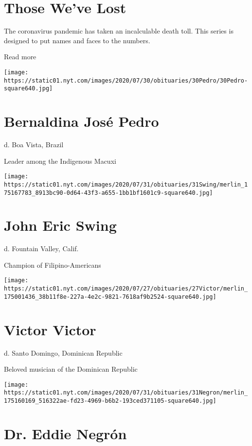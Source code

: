 \hypertarget{those-weve-lost}{%
\section{Those We've Lost}\label{those-weve-lost}}

The coronavirus pandemic has taken an incalculable death toll. This
series is designed to put names and faces to the numbers.

Read more

\texttt{[image: https://static01.nyt.com/images/2020/07/30/obituaries/30Pedro/30Pedro-square640.jpg]}

\hypertarget{bernaldina-josuxe9-pedro}{%
\section{Bernaldina José Pedro}\label{bernaldina-josuxe9-pedro}}

d. Boa Vista, Brazil

Leader among the Indigenous Macuxi

\texttt{[image: https://static01.nyt.com/images/2020/07/31/obituaries/31Swing/merlin\_175167783\_8913bc90-0d64-43f3-a655-1bb1bf1601c9-square640.jpg]}

\hypertarget{john-eric-swing}{%
\section{John Eric Swing}\label{john-eric-swing}}

d. Fountain Valley, Calif.

Champion of Filipino-Americans

\texttt{[image: https://static01.nyt.com/images/2020/07/27/obituaries/27Victor/merlin\_175001436\_38b11f8e-227a-4e2c-9821-7618af9b2524-square640.jpg]}

\hypertarget{victor-victor}{%
\section{Victor Victor}\label{victor-victor}}

d. Santo Domingo, Dominican Republic

Beloved musician of the Dominican Republic

\texttt{[image: https://static01.nyt.com/images/2020/07/31/obituaries/31Negron/merlin\_175160169\_516322ae-fd23-4969-b6b2-193ced371105-square640.jpg]}

\hypertarget{dr-eddie-negruxf3n}{%
\section{Dr. Eddie Negrón}\label{dr-eddie-negruxf3n}}

